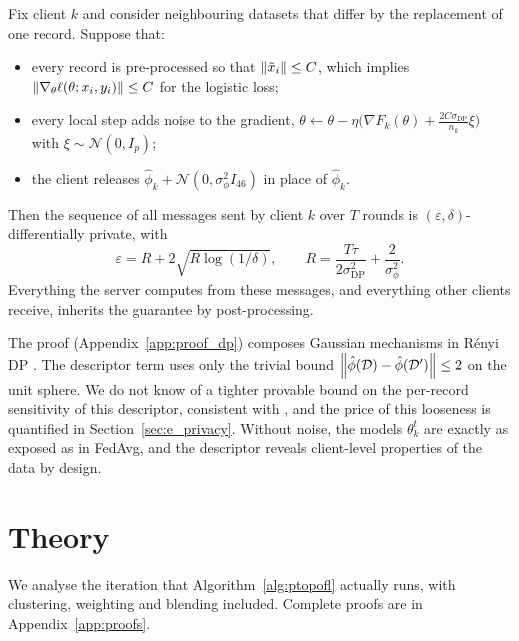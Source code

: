 \begin{proposition}
\label{prop:dp}
Fix client $k$ and consider neighbouring datasets that differ by the replacement of one
record. Suppose that:
\begin{itemize}[leftmargin=1.2em,itemsep=1pt]
  \item every record is pre-processed so that $\left\lVert \tilde x_i \right\rVert\le C$, which implies
    $\left\lVert \nabla_\theta\ell(\theta;x_i,y_i) \right\rVert\le C$ for the logistic loss;
  \item every local step adds noise to the gradient,
    $\theta\gets\theta-\eta\bigl(\nabla F_k(\theta)+\tfrac{2C\sigma_{\mathrm{DP}}}{n_k}\xi\bigr)$
    with $\xi\sim\mathcal N(0,I_p)$;
  \item the client releases $\hat\phi_k+\mathcal N(0,\sigma_\phi^2I_{46})$ in place of
    $\hat\phi_k$.
\end{itemize}
Then the sequence of all messages sent by client $k$ over $T$ rounds is
$(\varepsilon,\delta)$-differentially private, with
\[
  \varepsilon=R+2\sqrt{R\log(1/\delta)},\qquad R=\frac{T\tau}{2\sigma_{\mathrm{DP}}^2}+\frac{2}{\sigma_\phi^2}.
\]
Everything the server computes from these messages, and everything other clients receive,
inherits the guarantee by post-processing.
\end{proposition}
The proof (Appendix~\ref{app:proof_dp}) composes Gaussian mechanisms in R\'enyi DP
\citep{mironov2017renyi}. The descriptor term uses only the trivial bound
$\left\lVert \hat\phi(\mathcal{D})-\hat\phi(\mathcal{D}') \right\rVert\le2$ on the unit sphere. We do not know of a tighter
provable bound on the per-record sensitivity of this descriptor, consistent with
\citet{kang2024differentially}, and the price of this looseness is quantified in
Section~\ref{sec:e_privacy}. Without noise, the models $\theta_k^t$ are exactly as exposed as
in FedAvg, and the descriptor reveals client-level properties of the data by design.

\section{Theory}
\label{sec:theory}

We analyse the iteration that Algorithm~\ref{alg:ptopofl} actually runs, with clustering,
weighting and blending included. Complete proofs are in Appendix~\ref{app:proofs}.

